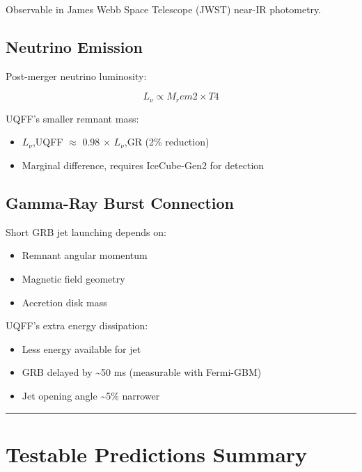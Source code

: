 \documentclass[12pt,a4paper]{article}
\begin{document}
Observable in James Webb Space Telescope (JWST) near-IR photometry.

\subsection{Neutrino Emission}

Post-merger neutrino luminosity:

\begin{equation}
L_\nu \propto M_rem2 \times T4
\end{equation}

UQFF's smaller remnant mass:

\begin{itemize}
  \item $L_{\nu}$,UQFF $\approx$ 0.98 $\times$ $L_{\nu}$,GR (2\% reduction)
  \item Marginal difference, requires IceCube-Gen2 for detection
\end{itemize}

\subsection{Gamma-Ray Burst Connection}

Short GRB jet launching depends on:

\begin{itemize}
  \item Remnant angular momentum
  \item Magnetic field geometry
  \item Accretion disk mass
\end{itemize}

UQFF's extra energy dissipation:

\begin{itemize}
  \item Less energy available for jet
  \item GRB delayed by \textasciitilde{}50 ms (measurable with Fermi-GBM)
  \item Jet opening angle \textasciitilde{}5\% narrower
\end{itemize}

\medskip\hrule\medskip

\section{Testable Predictions Summary}
\end{document}
